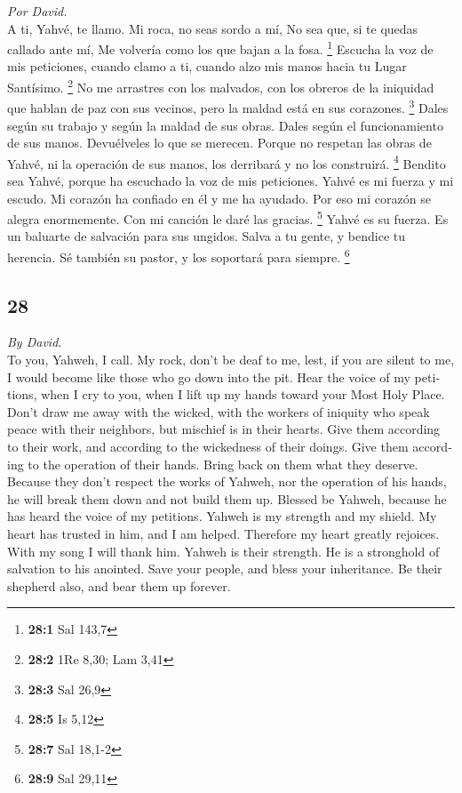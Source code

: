 \begin{paracol}{2}
\emph{Por David.}\\
 A ti, Yahvé, te llamo. Mi roca, no seas sordo a mí, No
sea que, si te quedas callado ante mí, Me volvería como los que bajan a
la fosa. \footnote{\textbf{28:1} Sal 143,7}  Escucha la
voz de mis peticiones, cuando clamo a ti, cuando alzo mis manos hacia tu
Lugar Santísimo. \footnote{\textbf{28:2} 1Re 8,30; Lam 3,41}
 No me arrastres con los malvados, con los obreros de la
iniquidad que hablan de paz con sus vecinos, pero la maldad está en sus
corazones. \footnote{\textbf{28:3} Sal 26,9}  Dales según
su trabajo y según la maldad de sus obras. Dales según el funcionamiento
de sus manos. Devuélveles lo que se merecen.  Porque no
respetan las obras de Yahvé, ni la operación de sus manos, los derribará
y no los construirá. \footnote{\textbf{28:5} Is 5,12} 
Bendito sea Yahvé, porque ha escuchado la voz de mis peticiones.
 Yahvé es mi fuerza y mi escudo. Mi corazón ha confiado en
él y me ha ayudado. Por eso mi corazón se alegra enormemente. Con mi
canción le daré las gracias. \footnote{\textbf{28:7} Sal 18,1-2}
 Yahvé es su fuerza. Es un baluarte de salvación para sus
ungidos.  Salva a tu gente, y bendice tu herencia. Sé
también su pastor, y los soportará para siempre. \footnote{\textbf{28:9}
  Sal 29,11}

\switchcolumn
\begin{otherlanguage}{english}

\hypertarget{section-55}{%
\section{28}\label{section-55}}

\emph{By David.}\\
 To you, Yahweh, I call. My rock, don't be deaf to me,
lest, if you are silent to me, I would become like those who go down
into the pit.  Hear the voice of my petitions, when I cry
to you, when I lift up my hands toward your Most Holy Place.
 Don't draw me away with the wicked, with the workers of
iniquity who speak peace with their neighbors, but mischief is in their
hearts.  Give them according to their work, and according
to the wickedness of their doings. Give them according to the operation
of their hands. Bring back on them what they deserve. 
Because they don't respect the works of Yahweh, nor the operation of his
hands, he will break them down and not build them up. 
Blessed be Yahweh, because he has heard the voice of my petitions.
 Yahweh is my strength and my shield. My heart has trusted
in him, and I am helped. Therefore my heart greatly rejoices. With my
song I will thank him.  Yahweh is their strength. He is a
stronghold of salvation to his anointed.  Save your
people, and bless your inheritance. Be their shepherd also, and bear
them up forever.


\end{otherlanguage}
\end{paracol}
